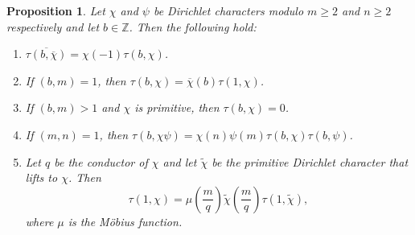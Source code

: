 \documentclass[12pt]{book}
\newtheorem{proposition}{Proposition}[section]
\theoremstyle{definition}\newframedtheorem{method}{Method}
\newcommand{\Z}{\mathbb{Z}}
\newcommand{\<}{\langle}
\renewcommand{\>}{\rangle}
\newcommand{\wtilde}{\widetilde}
\newcommand{\conj}{\overline}
\newcommand{\cchi}{\conj{\chi}}
\begin{document}
      \begin{proposition}\label{prop:Gauss_sum_reduction}
        Let $\chi$ and $\psi$ be Dirichlet characters modulo $m \ge 2$ and $n \ge 2$ respectively and let $b \in \Z$. Then the following hold:
        \begin{enumerate}[label=(\roman*)]
          \item $\conj{\tau(b,\cchi)} = \chi(-1)\tau(b,\chi)$.
          \item If $(b,m) = 1$, then $\tau(b,\chi) = \cchi(b)\tau(1,\chi)$.
          \item If $(b,m) > 1$ and $\chi$ is primitive, then $\tau(b,\chi) = 0$.
          \item If $(m,n) = 1$, then $\tau(b,\chi\psi) = \chi(n)\psi(m)\tau(b,\chi)\tau(b,\psi)$.
          \item Let $q$ be the conductor of $\chi$ and let $\wtilde{\chi}$ be the primitive Dirichlet character that lifts to $\chi$. Then
          \[
            \tau(1,\chi) = \mu\left(\frac{m}{q}\right)\wtilde{\chi}\left(\frac{m}{q}\right)\tau(1,\wtilde{\chi}),
          \]
          where $\mu$ is the M\"obius function.
        \end{enumerate}
      \end{proposition}
\end{document}
